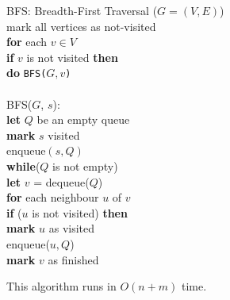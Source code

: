 \documentclass[twoside]{article}
\newcommand{\pc}[1]{\mbox{\textbf{#1}}} %
\begin{document}
\begin{algorithme}
	BFS: Breadth-First Traversal ($G = (V, E)$)\\
	\> mark all vertices as not-visited\\
	\> \pc{for} each $v \in V$\\
	\>\>\pc{if} $v$ is not visited \pc{then}\\
	\>\>\>\pc{do} \texttt{BFS($G, v$)}\\
	\\
	BFS($G$, $s$):\\
	\>\pc{let} $Q$ be an empty queue\\
	\>\pc{mark} $s$ visited\\
	\> enqueue$(s, Q)$\\
	\>\pc{while}($Q$ is not empty)\\
	\>\>\pc{let} $v$ = dequeue($Q$)\\
	\>\>\>\pc{for} each neighbour $u$ of $v$\\
	\>\>\>\>\pc{if} ($u$ is not visited) \pc{then}\\
	\>\>\>\>\>\pc{mark} $u$ as visited\\
	\>\>\>\>\> enqueue($u, Q$)\\
	\>\>\>\>\pc{mark} $v$ as finished
\end{algorithme}
This algorithm runs in $O(n +m)$ time. 
\end{document}
